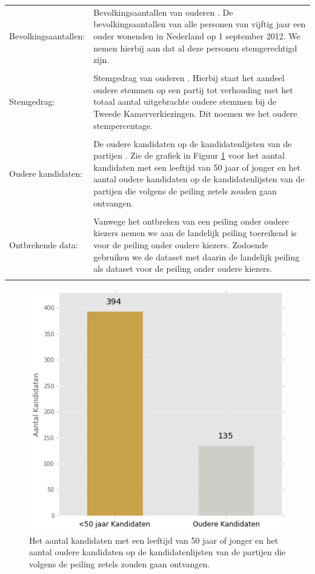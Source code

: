 \noindent\begin{tabularx}{\textwidth}{LI}
Bevolkingsaantallen: &Bevolkingsaantallen van ouderen \citep{CBS_allochtonen}. De bevolkingsaantallen van alle personen van vijftig jaar een ouder wonenden in Nederland op 1 september 2012. We nemen hierbij aan dat al deze personen stemgerechtigd zijn.   \\
\\  
Stemgedrag:  & Stemgedrag van ouderen \citep{CBS_stemgedrag}. Hierbij staat het aandeel oudere stemmen op een partij tot verhouding met het totaal aantal uitgebrachte oudere stemmen bij de Tweede Kamerverkiezingen. Dit noemen we het oudere stempercentage. \\
\\
Oudere kandidaten: & De oudere kandidaten op de kandidatenlijsten van de partijen \citep{allekandidaten}. Zie de grafiek in Figuur \ref{fig:jaKandidaten} voor het aantal kandidaten met een leeftijd van 50 jaar of jonger en het aantal oudere kandidaten op de kandidatenlijsten van de partijen die volgens de peiling zetels zouden gaan ontvangen. \\
  \\
Ontbrekende data: &  Vanwege het ontbreken van een peiling onder oudere kiezers nemen we aan de landelijk peiling toereikend is voor de peiling onder oudere kiezers. Zodoende gebruiken we de dataset met daarin de landelijk peiling als dataset voor de peiling onder oudere kiezers.\\
\\
 \end{tabularx}


\begin{figure}[H]
\centering
	\includegraphics[width=0.42\linewidth]{ja_kandidaten.png}

			\caption{Het aantal kandidaten met een leeftijd van 50 jaar of jonger en het aantal oudere kandidaten op de kandidatenlijsten van de partijen die volgens de peiling zetels zouden gaan ontvangen.}

\label{fig:jaKandidaten}
\end{figure}


